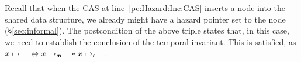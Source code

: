 Recall that when the CAS at line~\ref{pc:Hazard:Inc:CAS} inserts a node into the
shared data structure, we already might have a hazard pointer set to the
node (\S\ref{sec:informal}). The postcondition of the above triple states that,
in this case, we need to establish the conclusion of the temporal
invariant. This is satisfied, as $x \mapsto \_ \Leftrightarrow x \mapsto_{\sf m} \_
* x \mapsto_{\sf e} \_$. 





